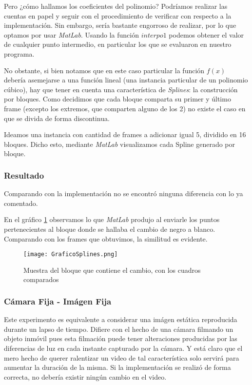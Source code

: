 Pero ¿c\'omo hallamos los coeficientes del polinomio? Podr\'iamos realizar las cuentas en papel y seguir con el procedimiento de verificar con respecto a la implementaci\'on. Sin embargo, ser\'ia bastante engorroso de realizar, por lo que optamos por usar \emph{MatLab}. Usando la funci\'on $interpo1$ podemos obtener el valor de cualquier punto intermedio, en particular los que se evaluaron en nuestro programa.

No obstante, si bien notamos que en este caso particular la funci\'on $f(x)$ debería asemejarse a una funci\'on lineal (una instancia particular de un polinomio cúbico), hay que tener en cuenta una característica de \emph{Splines}: la construcci\'on por bloques. Como decidimos que cada bloque comparta su primer y \'ultimo frame (excepto los extremos, que comparten alguno de los 2) no existe el caso en que se divida de forma discontinua.

Ideamos una instancia con cantidad de frames a adicionar igual 5, dividido en 16 bloques. Dicho esto, mediante \emph{MatLab} visualizamos cada Spline generado por bloque.

\subsubsection*{Resultado}

Comparando con la implementaci\'on no se encontr\'o ninguna diferencia con lo ya comentado.

En el gr\'afico \ref{fig:splineValidacion} observamos lo que \emph{MatLab} produjo al enviarle los puntos pertenecientes al bloque donde se hallaba el cambio de negro a blanco. Comparando con los frames que obtuvimos, la similitud es evidente.

\begin{figure}[H]
  \centering
    \texttt{[image: GraficoSplines.png]}
     \caption{Muestra del bloque que contiene el cambio, con los cuadros comparados}\label{fig:splineValidacion}
\end{figure}
\noindent

\subsubsection{C\'amara Fija - Im\'agen Fija}

Este experimento es equivalente a considerar una im\'agen estática reproducida durante un lapso de tiempo. Difiere con el hecho de una c\'amara filmando un objeto inmóvil pues esta filmación puede tener alteraciones producidas por las diferencias de luz en cada instante capturado por la cámara. Y est\'a claro que el mero hecho de querer ralentizar un video de tal caracter\'istica solo servir\'a para aumentar la duraci\'on de la misma. Si la implementaci\'on se realiz\'o de forma correcta, no debería existir ning\'un cambio en el video.

